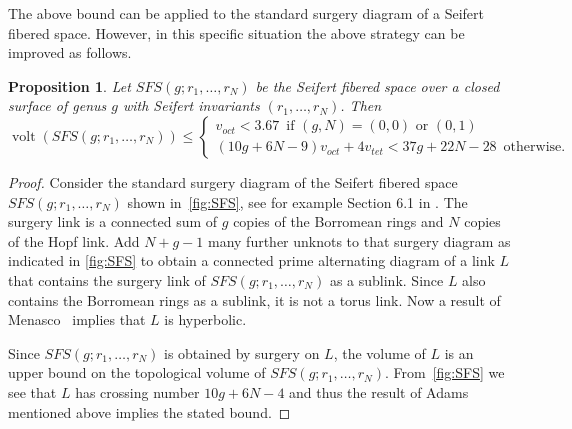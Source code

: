 \documentclass[a4paper]{gtart}
\newtheorem{proposition}{Proposition}[section]
\theoremstyle{definition}
\theoremstyle{remark}
\numberwithin{equation}{section}
\DeclareMathOperator{\volt}{volt}
\begin{document}
The above bound can be applied to the standard surgery diagram of a Seifert fibered space. However, in this specific situation the above strategy can be improved as follows.

\begin{proposition}\label{cor:SFS_bound}
    Let $SFS(g;r_1,\ldots,r_N)$ be the Seifert fibered space over a closed surface of genus $g$ with Seifert invariants $(r_1,\ldots,r_N)$. Then 
    \begin{equation*}
        \volt(SFS(g;r_1,\ldots,r_N))\leq \begin{cases}
        	v_{oct}<3.67 \, \textrm{ if $(g,N)=(0,0)$ or $(0,1)$}\\
(10g+6N-9)v_{oct}+4v_{tet}< 37g+22N-28 \,\textrm{ otherwise.}
        \end{cases}
    \end{equation*}
\end{proposition}

\begin{proof}
Consider the standard surgery diagram of the Seifert fibered space $SFS(g;r_1,\ldots,r_N)$ shown in~\cref{fig:SFS}, see for example Section 6.1 in \cite{GS}. The surgery link is a connected sum of $g$ copies of the Borromean rings and $N$ copies of the Hopf link. Add $N+g-1$ many further unknots to that surgery diagram as indicated in \cref{fig:SFS} to obtain a connected prime alternating diagram of a link $L$ that contains the surgery link of $SFS(g;r_1,\ldots,r_N)$ as a sublink. Since $L$ also contains the Borromean rings as a sublink, it is not a torus link. Now a result of Menasco~\cite{Menasco84} implies that $L$ is hyperbolic.
	
	Since $SFS(g;r_1,\ldots,r_N)$ is obtained by surgery on $L$, the volume of $L$ is an upper bound on the topological volume of $SFS(g;r_1,\ldots,r_N)$. From~\cref{fig:SFS} we see that $L$ has crossing number $10g+6N-4$ and thus the result of Adams~\cite{Adams_Bound} mentioned above implies the stated bound.
\end{proof}
\end{document}

